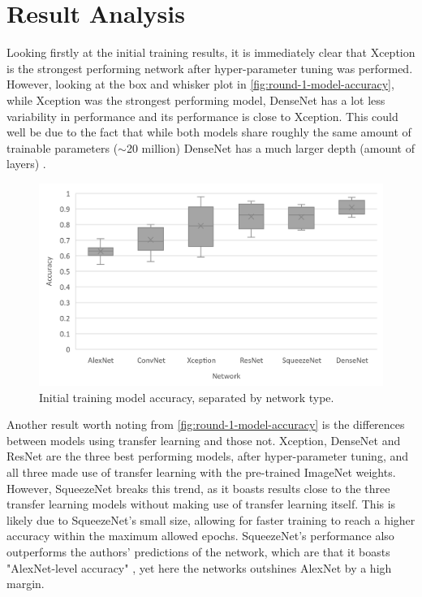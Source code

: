 \section{Result Analysis}
Looking firstly at the initial training results, it is immediately clear that Xception is the strongest performing network after hyper-parameter tuning was performed. However, looking at the box and whisker plot in \autoref{fig:round-1-model-accuracy}, while Xception was the strongest performing model, DenseNet has a lot less variability in performance and its performance is close to Xception. This could well be due to the fact that while both models share roughly the same amount of trainable parameters ($\sim$20 million) DenseNet has a much larger depth (amount of layers) \citep{KerasApp92:online}.

\begin{figure}[H]
    \centering
    \includegraphics[width=\textwidth]{figures/round-1-model-accuracy.png}
    \caption{Initial training model accuracy, separated by network type.}
    \label{fig:round-1-model-accuracy}
\end{figure}

Another result worth noting from \autoref{fig:round-1-model-accuracy} is the differences between models using transfer learning and those not. Xception, DenseNet and ResNet are the three best performing models, after hyper-parameter tuning, and all three made use of transfer learning with the pre-trained ImageNet weights. However, SqueezeNet breaks this trend, as it boasts results close to the three transfer learning models without making use of transfer learning itself. This is likely due to SqueezeNet's small size, allowing for faster training to reach a higher accuracy within the maximum allowed epochs. SqueezeNet's performance also outperforms the authors' predictions of the network, which are that it boasts "AlexNet-level accuracy" \citep{iandola2016squeezenet}, yet here the networks outshines AlexNet by a high margin.

